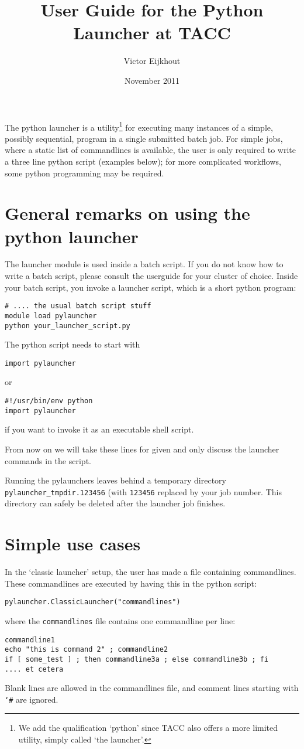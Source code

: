 \documentclass[11pt]{artikel3}
\newcommand\n[1]{{\tt #1}}
\begin{document}
\title{User Guide for the Python Launcher at TACC}
\author{Victor Eijkhout}
\date{November 2011}
\maketitle

The python launcher is a utility\footnote{We add the qualification
  `python' since TACC also offers a more limited utility, simply
  called `the launcher'.} for executing many instances of a
simple, possibly sequential, program in a single submitted batch
job. For simple jobs, where a static list of commandlines is
available, the user is only required to write a three line python
script (examples below); for more complicated workflows, some python
programming may be required.

\section*{General remarks on using the python launcher}

The launcher module is used inside a batch script. If you do not know
how to write a batch script, please consult the userguide for your
cluster of choice. Inside your batch script, you invoke a launcher
script, which is a short python program:
\begin{verbatim}
# .... the usual batch script stuff
module load pylauncher
python your_launcher_script.py
\end{verbatim}
The python script needs to start with
\begin{verbatim}
import pylauncher
\end{verbatim}
or 
\begin{verbatim}
#!/usr/bin/env python
import pylauncher
\end{verbatim}
if you want to invoke it as an executable shell script.

From now on we will take these lines for given and only discuss the
launcher commands in the script.

Running the pylaunchers leaves behind a temporary directory {\tt pylauncher_tmpdir.123456} (with {\tt 123456} replaced by your job number. This directory can safely be deleted after the launcher job finishes.

\section*{Simple use cases}

In the `classic launcher' setup, the user has made a file containing
commandlines. These commandlines are executed by having this in the
python script:
\begin{verbatim}
pylauncher.ClassicLauncher("commandlines")
\end{verbatim}
where the \n{commandlines} file contains one commandline per line:
\begin{verbatim}
commandline1
echo "this is command 2" ; commandline2
if [ some_test ] ; then commandline3a ; else commandline3b ; fi
.... et cetera
\end{verbatim}
Blank lines are allowed in the commandlines file, and comment lines
starting with \n{\char`\#} are ignored.
\end{document}
